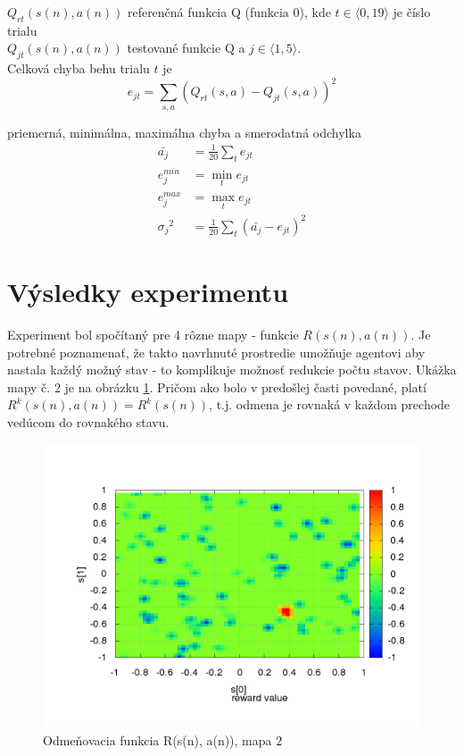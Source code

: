 $Q_{rt}(s(n),a(n))$ referenčná funkcia Q (funkcia 0), kde $t \in \langle 0, 19 \rangle $ je číslo trialu  \\
$Q_{jt}(s(n),a(n))$ testované funkcie Q a $j \in \langle 1, 5 \rangle $. \\

Celková chyba behu trialu $t$ je \\
\begin{equation}
e_{jt} = \sum\limits_{s, a}{(Q_{rt}(s,a) - Q_{jt}(s,a))^2}  \nonumber
\end{equation}

priemerná, minimálna, maximálna chyba a smerodatná odchylka \\
\begin{align}
\bar{a_j} &= \frac{1}{20}\sum\limits_{t}{e_{jt}}  \nonumber \\
{e^{min}_j} &= \min_{t}{e_{jt}}  \nonumber \\
{e^{max}_j} &= \max_{t}{e_{jt}}  \nonumber \\
{\sigma_j}^2 &= \frac{1}{20}\sum\limits_{t}{(\bar{a_j} - e_{jt})^2}  \nonumber
\end{align}

\section {Výsledky experimentu}

Experiment bol spočítaný pre 4 rôzne mapy - funkcie $R(s(n), a(n))$. Je potrebné
poznamenať, že takto navrhnuté prostredie umožňuje agentovi aby nastala
každý možný stav - to komplikuje možnosť redukcie počtu stavov. Ukážka mapy č. 2
je na obrázku \ref{img:experiment_reward_function}. Pričom ako bolo v predošlej
časti povedané, platí $R^k(s(n), a(n)) = R^k(s(n))$, t.j. odmena je rovnaká v každom
prechode vedúcom do rovnakého stavu.

\begin{figure}[!htb]
\centering
\includegraphics[scale=.4]{../../results_q_learning/map_2/reward_value_surface.png}
\caption{Odmeňovacia funkcia R(s(n), a(n)), mapa 2}
\label{img:experiment_reward_function}
\end{figure}


